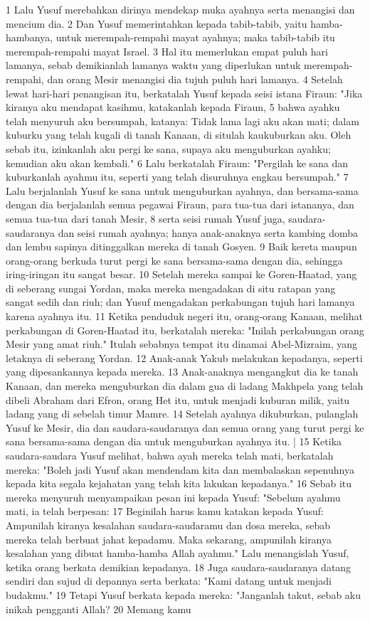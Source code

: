 \begin{biblechapter} %
1 Lalu Yusuf merebahkan dirinya mendekap muka ayahnya serta menangisi dan mencium dia. 2 Dan Yusuf memerintahkan kepada tabib-tabib, yaitu hamba-hambanya, untuk merempah-rempahi mayat ayahnya; maka tabib-tabib itu merempah-rempahi mayat Israel. 3 Hal itu memerlukan empat puluh hari lamanya, sebab demikianlah lamanya waktu yang diperlukan untuk merempah-rempahi, dan orang Mesir menangisi dia tujuh puluh hari lamanya. 4 Setelah lewat hari-hari penangisan itu, berkatalah Yusuf kepada seisi istana Firaun: "Jika kiranya aku mendapat kasihmu, katakanlah kepada Firaun, 5 bahwa ayahku telah menyuruh aku bersumpah, katanya: Tidak lama lagi aku akan mati; dalam kuburku yang telah kugali di tanah Kanaan, di situlah kaukuburkan aku. Oleh sebab itu, izinkanlah aku pergi ke sana, supaya aku menguburkan ayahku; kemudian aku akan kembali." 6 Lalu berkatalah Firaun: "Pergilah ke sana dan kuburkanlah ayahmu itu, seperti yang telah disuruhnya engkau bersumpah." 7 Lalu berjalanlah Yusuf ke sana untuk menguburkan ayahnya, dan bersama-sama dengan dia berjalanlah semua pegawai Firaun, para tua-tua dari istananya, dan semua tua-tua dari tanah Mesir, 8 serta seisi rumah Yusuf juga, saudara-saudaranya dan seisi rumah ayahnya; hanya anak-anaknya serta kambing domba dan lembu sapinya ditinggalkan mereka di tanah Gosyen. 9 Baik kereta maupun orang-orang berkuda turut pergi ke sana bersama-sama dengan dia, sehingga iring-iringan itu sangat besar. 10 Setelah mereka sampai ke Goren-Haatad, yang di seberang sungai Yordan, maka mereka mengadakan di situ ratapan yang sangat sedih dan riuh; dan Yusuf mengadakan perkabungan tujuh hari lamanya karena ayahnya itu. 11 Ketika penduduk negeri itu, orang-orang Kanaan, melihat perkabungan di Goren-Haatad itu, berkatalah mereka: "Inilah perkabungan orang Mesir yang amat riuh." Itulah sebabnya tempat itu dinamai Abel-Mizraim, yang letaknya di seberang Yordan. 12 Anak-anak Yakub melakukan kepadanya, seperti yang dipesankannya kepada mereka. 13 Anak-anaknya mengangkut dia ke tanah Kanaan, dan mereka menguburkan dia dalam gua di ladang Makhpela yang telah dibeli Abraham dari Efron, orang Het itu, untuk menjadi kuburan milik, yaitu ladang yang di sebelah timur Mamre. 14 Setelah ayahnya dikuburkan, pulanglah Yusuf ke Mesir, dia dan saudara-saudaranya dan semua orang yang turut pergi ke sana bersama-sama dengan dia untuk menguburkan ayahnya itu. | 15 Ketika saudara-saudara Yusuf melihat, bahwa ayah mereka telah mati, berkatalah mereka: "Boleh jadi Yusuf akan mendendam kita dan membalaskan sepenuhnya kepada kita segala kejahatan yang telah kita lakukan kepadanya." 16 Sebab itu mereka menyuruh menyampaikan pesan ini kepada Yusuf: "Sebelum ayahmu mati, ia telah berpesan: 17 Beginilah harus kamu katakan kepada Yusuf: Ampunilah kiranya kesalahan saudara-saudaramu dan dosa mereka, sebab mereka telah berbuat jahat kepadamu. Maka sekarang, ampunilah kiranya kesalahan yang dibuat hamba-hamba Allah ayahmu." Lalu menangislah Yusuf, ketika orang berkata demikian kepadanya. 18 Juga saudara-saudaranya datang sendiri dan sujud di depannya serta berkata: "Kami datang untuk menjadi budakmu." 19 Tetapi Yusuf berkata kepada mereka: "Janganlah takut, sebab aku inikah pengganti Allah? 20 Memang kamu 
\end{biblechapter}
